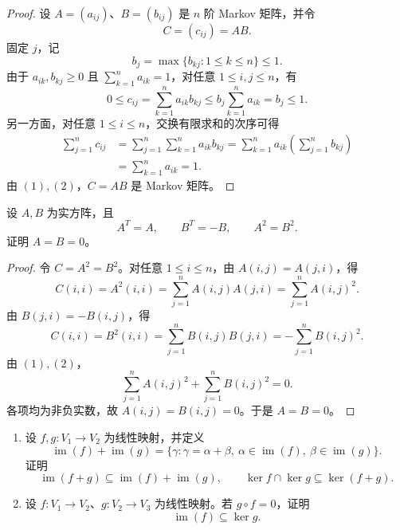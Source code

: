 \begin{proof}
	设 $A=(a_{ij})$、$B=(b_{ij})$ 是 $n$ 阶 Markov 矩阵，并令
	\[
	C=(c_{ij})=AB.
	\]
	固定 $j$，记
	\[
	b_j=\max\{b_{kj}:1\leq k\leq n\}\leq1.
	\]
	由于 $a_{ik},b_{kj}\geq0$ 且 $\sum_{k=1}^{n}a_{ik}=1$，对任意 $1\leq i,j\leq n$，有
	\begin{equation}\tag{1}
		0\leq c_{ij}=\sum_{k=1}^{n}a_{ik}b_{kj}
		\leq b_j\sum_{k=1}^{n}a_{ik}=b_j\leq1.
	\end{equation}
	另一方面，对任意 $1\leq i\leq n$，交换有限求和的次序可得
	\begin{equation}\tag{2}
		\begin{aligned}
			\sum_{j=1}^{n}c_{ij}
			&=\sum_{j=1}^{n}\sum_{k=1}^{n}a_{ik}b_{kj}
			=\sum_{k=1}^{n}a_{ik}\left(\sum_{j=1}^{n}b_{kj}\right)\\
			&=\sum_{k=1}^{n}a_{ik}=1.
		\end{aligned}
	\end{equation}
	由 $(1),(2)$，$C=AB$ 是 Markov 矩阵。
\end{proof}

\begin{problem}
 设 $A,B$ 为实方阵，且
	\[
	A^{T}=A,\qquad B^{T}=-B,\qquad A^{2}=B^{2}.
	\]
	证明 $A=B=0$。
\end{problem}

\begin{proof}
	令 $C=A^{2}=B^{2}$。对任意 $1\leq i\leq n$，由 $A(i,j)=A(j,i)$，得
	\begin{equation}\tag{1}
		C(i,i)=A^{2}(i,i)
		=\sum_{j=1}^{n}A(i,j)A(j,i)
		=\sum_{j=1}^{n}A(i,j)^{2}.
	\end{equation}
	由 $B(j,i)=-B(i,j)$，得
	\begin{equation}\tag{2}
		C(i,i)=B^{2}(i,i)
		=\sum_{j=1}^{n}B(i,j)B(j,i)
		=-\sum_{j=1}^{n}B(i,j)^{2}.
	\end{equation}
	由 $(1),(2)$，
	\begin{equation}\tag{3}
		\sum_{j=1}^{n}A(i,j)^{2}+\sum_{j=1}^{n}B(i,j)^{2}=0.
	\end{equation}
	各项均为非负实数，故 $A(i,j)=B(i,j)=0$。于是 $A=B=0$。
\end{proof}

\begin{problem}
	\begin{enumerate}
		\item 设 $f,g:V_1\to V_2$ 为线性映射，并定义
		\[
		\operatorname{im}(f)+\operatorname{im}(g)
		=\{\gamma:\gamma=\alpha+\beta,
		\ \alpha\in\operatorname{im}(f),\ \beta\in\operatorname{im}(g)\}.
		\]
		证明
		\[
		\operatorname{im}(f+g)\subseteq
		\operatorname{im}(f)+\operatorname{im}(g),
		\qquad
		\ker f\cap\ker g\subseteq\ker(f+g).
		\]
		
		\item 设 $f:V_1\to V_2$、$g:V_2\to V_3$ 为线性映射。若 $g\circ f=0$，证明
		\[
		\operatorname{im}(f)\subseteq\ker g.
		\]
	\end{enumerate}
\end{problem}

